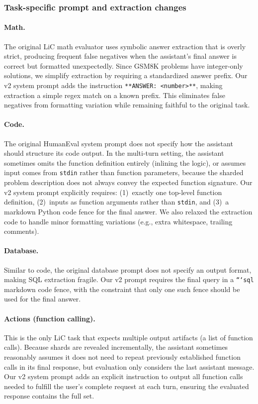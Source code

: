 \documentclass{article} %
\begin{document}
\subsubsection{Task-specific prompt and extraction changes}
\label{app:eval-adjustments}

\paragraph{Math.} The original LiC math evaluator uses symbolic answer extraction that is overly strict, producing frequent false negatives when the assistant's final answer is correct but formatted unexpectedly. Since GSM8K problems have integer-only solutions, we simplify extraction by requiring a standardized answer prefix. Our v2 system prompt adds the instruction \texttt{**ANSWER: <number>**}, making extraction a simple regex match on a known prefix. This eliminates false negatives from formatting variation while remaining faithful to the original task.

\paragraph{Code.} The original HumanEval system prompt does not specify how the assistant should structure its code output. In the multi-turn setting, the assistant sometimes omits the function definition entirely (inlining the logic), or assumes input comes from \texttt{stdin} rather than function parameters, because the sharded problem description does not always convey the expected function signature. Our v2 system prompt explicitly requires: (1)~exactly one top-level function definition, (2)~inputs as function arguments rather than \texttt{stdin}, and (3)~a markdown Python code fence for the final answer. We also relaxed the extraction code to handle minor formatting variations (e.g., extra whitespace, trailing comments).

\paragraph{Database.} Similar to code, the original database prompt does not specify an output format, making SQL extraction fragile. Our v2 prompt requires the final query in a \texttt{```sql} markdown code fence, with the constraint that only one such fence should be used for the final answer.

\paragraph{Actions (function calling).} This is the only LiC task that expects multiple output artifacts (a list of function calls). Because shards are revealed incrementally, the assistant sometimes reasonably assumes it does not need to repeat previously established function calls in its final response, but evaluation only considers the last assistant message. Our v2 system prompt adds an explicit instruction to output all function calls needed to fulfill the user's complete request at each turn, ensuring the evaluated response contains the full set.
\end{document}
